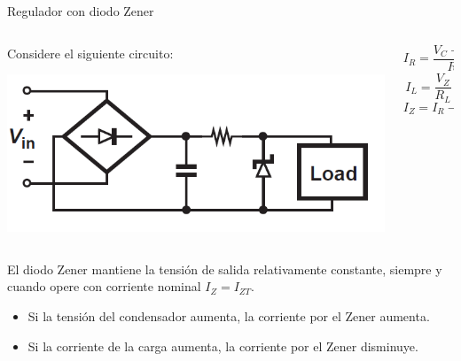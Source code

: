 \documentclass[t,aspectratio=169]{beamer}
\begin{document}
\begin{frame}{Regulador con diodo Zener}

\begin{columns}
\begin{column}{0.5\textwidth}
    Considere el siguiente circuito:
    
    \vspace{5mm}\includegraphics[width=\textwidth]{figures/rectifier_with_zener.png}
\end{column}
\begin{column}{0.5\textwidth}
    \[ I_R = \dfrac{V_C - V_Z}{R_S} \]
    \[ I_L = \dfrac{V_Z}{R_L} \]
    \[ I_Z = I_R - I_L \]
\end{column}
\end{columns}

\vspace{5mm}El diodo Zener mantiene la tensión de salida relativamente constante, siempre y cuando opere con corriente nominal $I_Z = I_{ZT}$.

\begin{itemize}
    \item Si la tensión del condensador aumenta, la corriente por el Zener aumenta.
    \item Si la corriente de la carga aumenta, la corriente por el Zener disminuye.
\end{itemize}
\end{frame}
\end{document}
